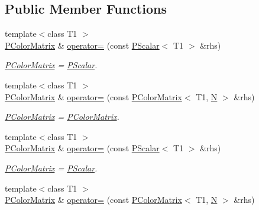\subsection*{Public Member Functions}
\begin{DoxyCompactItemize}
\item 
{\footnotesize template$<$class T1 $>$ }\\\mbox{\hyperlink{classENSEM_1_1PColorMatrix}{P\+Color\+Matrix}} \& \mbox{\hyperlink{classENSEM_1_1PColorMatrix_a7750e72b224e47b6a559f3dc112b72d3}{operator=}} (const \mbox{\hyperlink{classENSEM_1_1PScalar}{P\+Scalar}}$<$ T1 $>$ \&rhs)
\begin{DoxyCompactList}\small\item\em \mbox{\hyperlink{classENSEM_1_1PColorMatrix}{P\+Color\+Matrix}} = \mbox{\hyperlink{classENSEM_1_1PScalar}{P\+Scalar}}. \end{DoxyCompactList}\item 
{\footnotesize template$<$class T1 $>$ }\\\mbox{\hyperlink{classENSEM_1_1PColorMatrix}{P\+Color\+Matrix}} \& \mbox{\hyperlink{classENSEM_1_1PColorMatrix_a529b6a2c63f2087a6a336af14b6f80eb}{operator=}} (const \mbox{\hyperlink{classENSEM_1_1PColorMatrix}{P\+Color\+Matrix}}$<$ T1, \mbox{\hyperlink{adat__devel_2lib_2hadron_2operator__name__util_8cc_a7722c8ecbb62d99aee7ce68b1752f337}{N}} $>$ \&rhs)
\begin{DoxyCompactList}\small\item\em \mbox{\hyperlink{classENSEM_1_1PColorMatrix}{P\+Color\+Matrix}} = \mbox{\hyperlink{classENSEM_1_1PColorMatrix}{P\+Color\+Matrix}}. \end{DoxyCompactList}\item 
{\footnotesize template$<$class T1 $>$ }\\\mbox{\hyperlink{classENSEM_1_1PColorMatrix}{P\+Color\+Matrix}} \& \mbox{\hyperlink{classENSEM_1_1PColorMatrix_a7750e72b224e47b6a559f3dc112b72d3}{operator=}} (const \mbox{\hyperlink{classENSEM_1_1PScalar}{P\+Scalar}}$<$ T1 $>$ \&rhs)
\begin{DoxyCompactList}\small\item\em \mbox{\hyperlink{classENSEM_1_1PColorMatrix}{P\+Color\+Matrix}} = \mbox{\hyperlink{classENSEM_1_1PScalar}{P\+Scalar}}. \end{DoxyCompactList}\item 
{\footnotesize template$<$class T1 $>$ }\\\mbox{\hyperlink{classENSEM_1_1PColorMatrix}{P\+Color\+Matrix}} \& \mbox{\hyperlink{classENSEM_1_1PColorMatrix_a529b6a2c63f2087a6a336af14b6f80eb}{operator=}} (const \mbox{\hyperlink{classENSEM_1_1PColorMatrix}{P\+Color\+Matrix}}$<$ T1, \mbox{\hyperlink{adat__devel_2lib_2hadron_2operator__name__util_8cc_a7722c8ecbb62d99aee7ce68b1752f337}{N}} $>$ \&rhs)

\end{DoxyCompactItemize}
